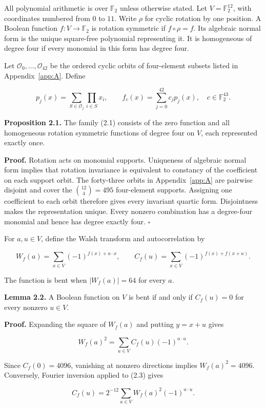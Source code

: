 \documentclass[pdflatex,sn-mathphys-num]{sn-jnl}
\begin{document}
All polynomial arithmetic is over $\mathbb F_2$ unless otherwise stated. Let $V=\mathbb F_2^{12}$, with coordinates numbered from $0$ to $11$. Write $\rho$ for cyclic rotation by one position. A Boolean function $f:V\to\mathbb F_2$ is rotation symmetric if $f\circ\rho=f$. Its algebraic normal form is the unique square-free polynomial representing it. It is homogeneous of degree four if every monomial in this form has degree four.

Let $\mathcal O_0,\ldots,\mathcal O_{42}$ be the ordered cyclic orbits of four-element subsets listed in Appendix~\ref{app:A}. Define

\[
p_j(x)=\sum_{S\in\mathcal O_j}\prod_{i\in S}x_i,
\qquad f_c(x)=\sum_{j=0}^{42}c_jp_j(x),\quad c\in\mathbb F_2^{43}. \tag{2.1}
\]

\textbf{Proposition 2.1.} The family (2.1) consists of the zero function and all homogeneous rotation symmetric functions of degree four on $V$, each represented exactly once.

\textbf{Proof.} Rotation acts on monomial supports. Uniqueness of algebraic normal form implies that rotation invariance is equivalent to constancy of the coefficient on each support orbit. The forty-three orbits in Appendix~\ref{app:A} are pairwise disjoint and cover the $\binom{12}{4}=495$ four-element supports. Assigning one coefficient to each orbit therefore gives every invariant quartic form. Disjointness makes the representation unique. Every nonzero combination has a degree-four monomial and hence has degree exactly four. \hfill$\square$

\enlargethispage{2pt}
For $a,u\in V$, define the Walsh transform and autocorrelation by

\[
W_f(a)=\sum_{x\in V}(-1)^{f(x)+a\cdot x},\qquad
C_f(u)=\sum_{x\in V}(-1)^{f(x)+f(x+u)}. \tag{2.2}
\]

The function is bent when $|W_f(a)|=64$ for every $a$.

\textbf{Lemma 2.2.} A Boolean function on $V$ is bent if and only if $C_f(u)=0$ for every nonzero $u\in V$.

\textbf{Proof.} Expanding the square of $W_f(a)$ and putting $y=x+u$ gives

\[
W_f(a)^2=\sum_{u\in V}C_f(u)(-1)^{a\cdot u}. \tag{2.3}
\]

Since $C_f(0)=4096$, vanishing at nonzero directions implies $W_f(a)^2=4096$. Conversely, Fourier inversion applied to (2.3) gives

\[
C_f(u)=2^{-12}\sum_{a\in V}W_f(a)^2(-1)^{a\cdot u}.
\]
\end{document}
